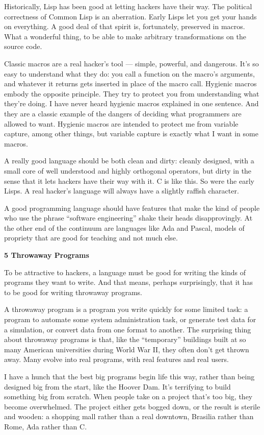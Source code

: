 Historically, Lisp has been good at letting hackers have their way. The
political correctness of Common Lisp is an aberration. Early Lisps let
you get your hands on everything. A good deal of that spirit is,
fortunately, preserved in macros. What a wonderful thing, to be able to
make arbitrary transformations on the source code.

Classic macros are a real hacker's tool --- simple, powerful, and
dangerous. It's so easy to understand what they do: you call a function
on the macro's arguments, and whatever it returns gets inserted in place
of the macro call. Hygienic macros embody the opposite principle. They
try to protect you from understanding what they're doing. I have never
heard hygienic macros explained in one sentence. And they are a classic
example of the dangers of deciding what programmers are allowed to want.
Hygienic macros are intended to protect me from variable capture, among
other things, but variable capture is exactly what I want in some
macros.

A really good language should be both clean and dirty: cleanly designed,
with a small core of well understood and highly orthogonal operators,
but dirty in the sense that it lets hackers have their way with it. C is
like this. So were the early Lisps. A real hacker's language will always
have a slightly raffish character.

A good programming language should have features that make the kind of
people who use the phrase ``software engineering'' shake their heads
disapprovingly. At the other end of the continuum are languages like Ada
and Pascal, models of propriety that are good for teaching and not much
else.

\textbf{5 Throwaway Programs}

To be attractive to hackers, a language must be good for writing the
kinds of programs they want to write. And that means, perhaps
surprisingly, that it has to be good for writing throwaway programs.

A throwaway program is a program you write quickly for some limited
task: a program to automate some system administration task, or generate
test data for a simulation, or convert data from one format to another.
The surprising thing about throwaway programs is that, like the
``temporary'' buildings built at so many American universities during
World War II, they often don't get thrown away. Many evolve into real
programs, with real features and real users.

I have a hunch that the best big programs begin life this way, rather
than being designed big from the start, like the Hoover Dam. It's
terrifying to build something big from scratch. When people take on a
project that's too big, they become overwhelmed. The project either gets
bogged down, or the result is sterile and wooden: a shopping mall rather
than a real downtown, Brasilia rather than Rome, Ada rather than C.

